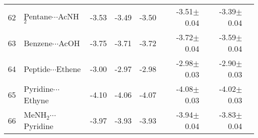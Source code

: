 \begin{longtable}{llrrrrrr}
62 & Pentane$\cdots$AcNH$_2$ & -3.53 & -3.49 & -3.50 & -3.51$\pm$0.04 & -3.39$\pm$0.04 \\
63 & Benzene$\cdots$AcOH & -3.75 & -3.71 & -3.72 & -3.72$\pm$0.04 & -3.59$\pm$0.04 \\
64 & Peptide$\cdots$Ethene & -3.00 & -2.97 & -2.98 & -2.98$\pm$0.03 & -2.90$\pm$0.03 \\
65 & Pyridine$\cdots$Ethyne & -4.10 & -4.06 & -4.07 & -4.08$\pm$0.03 & -4.02$\pm$0.03 \\
66 & MeNH$_2$$\cdots$Pyridine & -3.97 & -3.93 & -3.93 & -3.94$\pm$0.04 & -3.83$\pm$0.04 \\
\end{longtable}